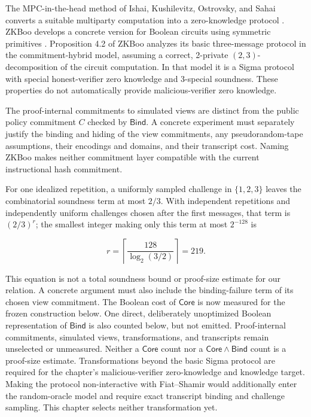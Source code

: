 The MPC-in-the-head method of Ishai, Kushilevitz, Ostrovsky, and Sahai converts
a suitable multiparty computation into a zero-knowledge protocol
\cite{ishai2007zeroknowledgemp}. ZKBoo develops a concrete version for Boolean
circuits using symmetric primitives \cite{giacomelli2016zkboo}. Proposition
4.2 of ZKBoo analyzes its basic three-message protocol in the
commitment-hybrid model, assuming a correct, 2-private $(2,3)$-decomposition of
the circuit computation. In that model it is a Sigma protocol with special
honest-verifier zero knowledge and 3-special soundness. These properties do not
automatically provide malicious-verifier zero knowledge.

The proof-internal commitments to simulated views are distinct from the public
policy commitment $C$ checked by $\mathsf{Bind}$. A concrete experiment must
separately justify the binding and hiding of the view commitments, any
pseudorandom-tape assumptions, their encodings and domains, and their transcript
cost. Naming ZKBoo makes neither commitment layer compatible with the current
instructional hash commitment.

For one idealized repetition, a uniformly sampled challenge in
$\{1,2,3\}$ leaves the combinatorial soundness term at most $2/3$. With
independent repetitions and independently uniform challenges chosen after the
first messages, that term is $(2/3)^r$; the smallest integer making only this
term at most $2^{-128}$ is

\[
 r=\left\lceil\frac{128}{\log_2(3/2)}\right\rceil=219.
\]

This equation is not a total soundness bound or proof-size estimate for our
relation. A concrete argument must also include the binding-failure term of its
chosen view commitment. The Boolean cost of \(\mathsf{Core}\) is now measured
for the frozen construction below. One direct, deliberately unoptimized
Boolean representation of \(\mathsf{Bind}\) is also counted below, but not
emitted. Proof-internal commitments, simulated views, transformations, and
transcripts remain unselected or unmeasured. Neither a
\(\mathsf{Core}\) count nor a \(\mathsf{Core}\land\mathsf{Bind}\) count is a
proof-size estimate. Transformations beyond the basic Sigma protocol are required for the chapter's
malicious-verifier zero-knowledge and knowledge target. Making the protocol
non-interactive with Fiat--Shamir would additionally enter the random-oracle
model and require exact transcript binding and challenge sampling. This chapter
selects neither transformation yet.

